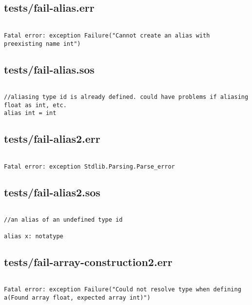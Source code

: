 \documentclass[main.tex]{subfiles}
\begin{document}
\subsection{tests/fail-alias.err}

\begin{lstlisting}

Fatal error: exception Failure("Cannot create an alias with preexisting name int")
\end{lstlisting}

\subsection{tests/fail-alias.sos}

\begin{lstlisting}

//aliasing type id is already defined. could have problems if aliasing float as int, etc.
alias int = int
\end{lstlisting}

\subsection{tests/fail-alias2.err}

\begin{lstlisting}

Fatal error: exception Stdlib.Parsing.Parse_error
\end{lstlisting}

\subsection{tests/fail-alias2.sos}

\begin{lstlisting}

//an alias of an undefined type id

alias x: notatype
\end{lstlisting}

\subsection{tests/fail-array-construction2.err}

\begin{lstlisting}

Fatal error: exception Failure("Could not resolve type when defining a(Found array float, expected array int)")
\end{lstlisting}
\end{document}
